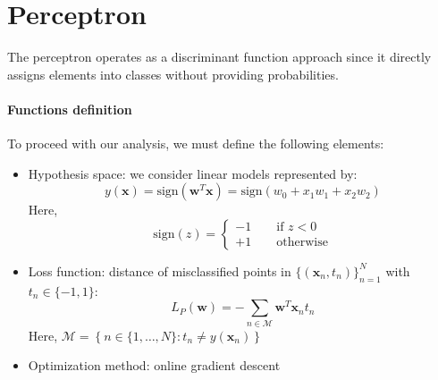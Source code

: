 \section{Perceptron}

The perceptron operates as a discriminant function approach since it directly assigns elements into classes without providing probabilities.
\paragraph*{Functions definition}
To proceed with our analysis, we must define the following elements:
\begin{itemize}
    \item Hypothesis space: we consider linear models represented by:
        \[y(\textbf{x})=\text{sign}(\textbf{w}^T\textbf{x})=\text{sign}(w_0+x_1w_1+x_2w_2)\]
        Here, 
        \[\text{sign}(z)=\begin{cases}
            -1 \qquad\text{if }z<0 \\
            +1 \qquad\text{otherwise}
        \end{cases}\]
    \item Loss function: distance of misclassified points in $\{(\textbf{x}_n, t_n)\}^{N}_{n=1}$ with $t_n\in\{-1,1\}$: 
        \[L_P(\textbf{w})=-\sum_{n\in\mathcal{M}}\textbf{w}^T\textbf{x}_nt_n\]
        Here, $\mathcal{M}=\left\{ n\in\{1,\dots,N\}:t_n\neq y(\textbf{x}_n) \right\}$
    \item Optimization method: online gradient descent
\end{itemize}

